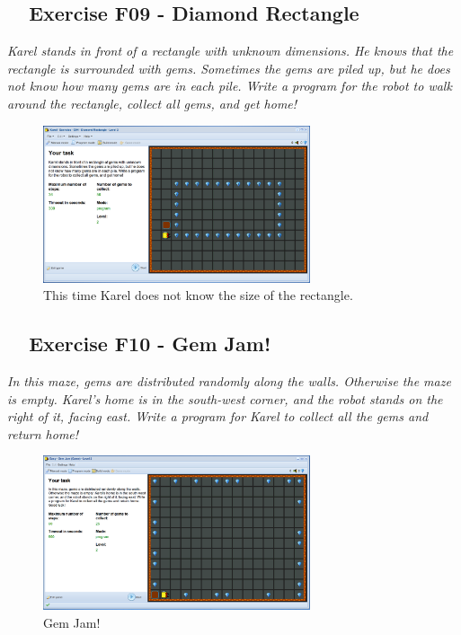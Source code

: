 \documentclass[article,A4,12pt]{llncs}
\begin{document}
\subsection{\ \ Exercise F09 - Diamond Rectangle}

{\em Karel stands in front of a rectangle with unknown dimensions. He knows that the rectangle is surrounded with gems. Sometimes the gems are piled up, but he does not know how many gems are in each pile. Write a program for the robot to walk around the rectangle, collect all gems, and get home!}

\newpage

\begin{figure}[!ht]
\begin{center}
\includegraphics[width=0.7\textwidth]{img/g04.png}
\end{center}
\vspace{-4mm}
\caption{This time Karel does not know the size of the rectangle.}
\label{fig:g04}
\vspace{-10mm}
\end{figure}
\noindent

\subsection{\ \ Exercise F10 - Gem Jam!}

{\em In this maze, gems are distributed randomly along the walls. Otherwise 
the maze is empty. Karel's home is in the south-west corner, and the robot 
stands on the right of it, facing east. Write a program for Karel to collect 
all the gems and return home!}

\begin{figure}[!ht]
\begin{center}
\includegraphics[width=0.7\textwidth]{img/g05.png}
\end{center}
\vspace{-4mm}
\caption{Gem Jam!}
\label{fig:g05}
\vspace{-10mm}
\end{figure}
\noindent
\end{document}
